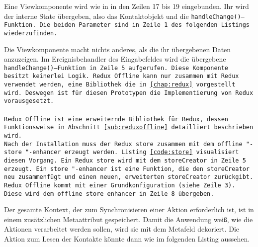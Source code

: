 Eine Viewkomponente wird wie in in den Zeilen 17 bis 19 eingebunden. Ihr wird der interne State übergeben, also das Kontaktobjekt und die \tt{handleChange()}--Funktion. 
Die beiden Parameter sind in Zeile 1 des folgenden Listings wiederzufinden.
\begin{center}
  
\end{center}
%
Die Viewkomponente macht nichts anderes, als die ihr übergebenen Daten anzuzeigen.
Im Ereignisbehandler des Eingabefeldes wird die übergebene \tt{handleChange()}--Funktion in Zeile 5 aufgerufen.
Diese Komponente besitzt keinerlei Logik.
%
%
Redux Offline kann nur zusammen mit Redux verwendet werden, eine Bibliothek die in \autoref{chap:redux} vorgestellt wird.
Deswegen ist für diesen Prototypen die Implementierung von Redux vorausgesetzt.\\\\
%
Redux Offline ist eine erweiternde Bibliothek für Redux, dessen Funktionsweise in Abschnitt \ref{sub:reduxoffline} detailliert beschrieben wird.\\
Nach der Installation muss der Redux \tt{store} zusammen mit dem \tt{offline "-store "-enhancer} erzeugt werden. Listing \ref{code:store} visualisiert diesen Vorgang. Ein Redux \tt{store} wird mit dem \tt{storeCreator} in Zeile 5 erzeugt. Ein \tt{store "-enhancer} ist eine Funktion, die den \tt{storeCreator} neu zusammenfügt und einen neuen, erweiterten \tt{storeCreator} zurückgibt.
Redux Offline kommt mit einer Grundkonfiguration (siehe Zeile 3). Diese wird dem \tt{offline store enhancer} in Zeile 8 übergeben.\\
%
\begin{center}
  
\end{center}
%
Der gesamte Kontext, der zum Synchronisieren einer Aktion erforderlich ist, ist in einem zusätzlichen Metaattribut gespeichert.
Damit die Anwendung weiß, wie die Aktionen verarbeitet werden sollen, wird sie mit dem Metafeld dekoriert.
Die Aktion zum Lesen der Kontakte könnte dann wie im folgenden Listing aussehen.
%
\begin{center}
  
\end{center}
